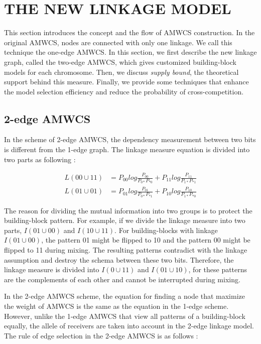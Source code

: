 \documentclass{sig-alternate-05-2015}
\begin{document}
\section{THE NEW LINKAGE MODEL}
This section introduces the concept and the flow of AMWCS construction. In the original AMWCS, nodes are connected with only one linkage. We call this technique the one-edge AMWCS. In this section, we first describe the new linkage graph, called the two-edge AMWCS, which gives customized building-block models for each chromosome. Then, we discuss \textit{supply bound}, the theoretical support behind this measure. Finally, we provide some techniques that enhance the model selection efficiency and reduce the probability of cross-competition. 

\subsection{2-edge AMWCS}
In the scheme of 2-edge AMWCS, the dependency measurement between two bits is different from the 1-edge graph. The linkage measure equation is divided into two parts as following : 

\begin{equation} 
\begin{split}
L( 00 \cup 11 ) &= P_{00 }log\frac{P_{00}}{P_{0*} P_{*0}} + P_{11 }log\frac{P_{11}}{P_{1*} P_{*1}}  \\
L( 01 \cup 01 ) &= P_{01 }log\frac{P_{01}}{P_{0*} P_{*1}} + P_{10 }log\frac{P_{10}}{P_{1*} P_{*0}}  
\end{split}
\end{equation}

The reason for dividing the mutual information into two groups is to protect the building-block pattern. For example, if we divide the linkage measure into two parts, $I(01 \cup 00)$ and $I (10 \cup 11)$. For building-blocks with linkage $I(01\cup00)$, the pattern 01 might be flipped to 10 and the pattern 00 might be flipped to 11 during mixing. The resulting patterns contradict with the linkage assumption and destroy the schema between these two bits. Therefore, the linkage measure is divided  into $I(0\cup11)$ and $I(01\cup10)$, for these patterns are the complements of each other and cannot be interrupted during mixing.


In the 2-edge AMWCS scheme, the equation for finding a node that maximize the weight of AMWCS is the same as the equation in the  1-edge scheme. However, unlike the 1-edge AMWCS that view all patterns of a building-block equally, the allele of receivers are taken into account in the 2-edge linkage model. The rule of edge selection in the 2-edge AMWCS is as follows :
\end{document}
